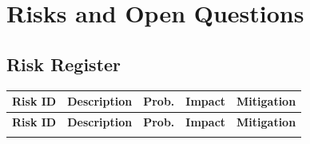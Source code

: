 \documentclass[12pt,a4paper]{article}
\begin{document}
\newpage
\section{Risks and Open Questions}

\subsection{Risk Register}

\begin{longtable}{@{}L{2cm}L{4.5cm}L{1.5cm}L{1.5cm}L{5cm}@{}}
  
    \textbf{Risk ID} & \textbf{Description} & \textbf{Prob.} & \textbf{Impact} & \textbf{Mitigation} \\
  \midrule
  \endfirsthead
  
    \textbf{Risk ID} & \textbf{Description} & \textbf{Prob.} & \textbf{Impact} & \textbf{Mitigation} \\
  \midrule
  \endhead
  
  \endfoot


\end{longtable}
\end{document}
